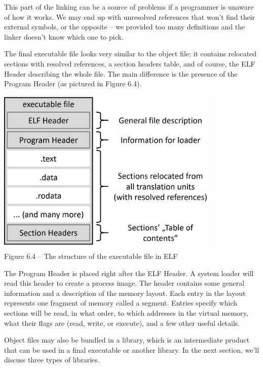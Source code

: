 This part of the linking can be a source of problems if a programmer is unaware of how it works. We may end up with unresolved references that won't find their external symbols, or the opposite – we provided too many definitions and the linker doesn't know which one to pick.

The final executable file looks very similar to the object file; it contains relocated sections with resolved references, a section headers table, and of course, the ELF Header describing the whole file. The main difference is the presence of the Program Header (as pictured in Figure 6.4).

\begin{center}
\includegraphics[width=0.8\textwidth]{content/2/chapter6/images/4.jpg}\\
Figure 6.4 – The structure of the executable file in ELF
\end{center}

The Program Header is placed right after the ELF Header. A system loader will read this header to create a process image. The header contains some general information and a description of the memory layout. Each entry in the layout represents one fragment of memory called a segment. Entries specify which sections will be read, in what order, to which addresses in the virtual memory, what their flags are (read, write, or execute), and a few other useful details.

Object files may also be bundled in a library, which is an intermediate product that can be used in a final executable or another library. In the next section, we'll discuss three types of libraries.



